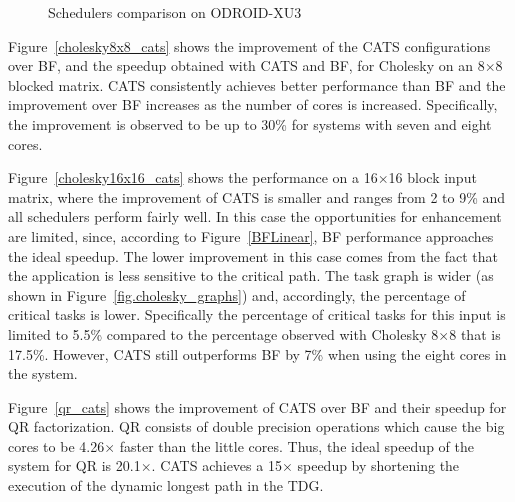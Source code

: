 \begin{figure}[!t]
{		\label{heat_cats}
	}
	\caption{Schedulers comparison on ODROID-XU3}
\end{figure}
Figure~\ref{cholesky8x8_cats} shows the improvement of the CATS configurations over BF, and the speedup obtained with CATS and BF, for Cholesky on an 8$\times$8 blocked matrix. 
CATS consistently achieves better performance than BF and the improvement over BF increases as the number of cores is increased. 
Specifically, the improvement is observed to be up to 30\% for systems with seven and eight cores. 

Figure~\ref{cholesky16x16_cats} shows the performance on a 16$\times$16 block input matrix, where the improvement of CATS is smaller and ranges from 2 to 9\% and all schedulers perform fairly well. 
In this case the opportunities for enhancement are limited, since, according to Figure~\ref{BFLinear}, BF performance approaches the ideal speedup. 
The lower improvement in this case comes from the fact that the application is less sensitive to the critical path. 
The task graph is wider (as shown in Figure~\ref{fig.cholesky_graphs}) and, accordingly, the percentage of critical tasks is lower. 
Specifically the percentage of critical tasks for this input is limited to 5.5\% compared to the percentage observed with Cholesky 8$\times$8 that is 17.5\%. 
However, CATS still outperforms BF by 7\% when using the eight cores in the system.%


Figure~\ref{qr_cats} shows the improvement of CATS over BF and their speedup for QR factorization. 
QR consists of double precision operations which cause the big cores to be 4.26$\times$ faster than the little cores. Thus, the ideal speedup of the system for QR is 20.1$\times$. 
CATS achieves a 15$\times$ speedup by shortening the execution of the dynamic longest path in the TDG. 

